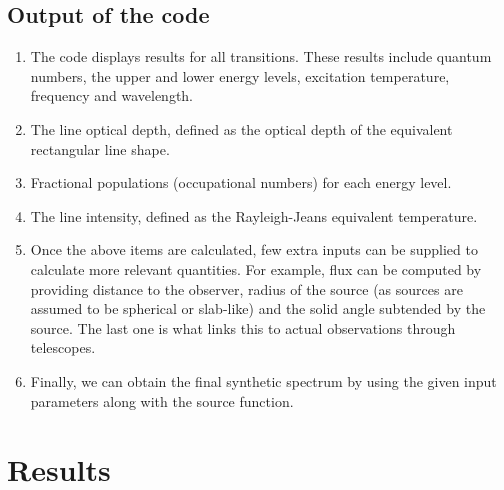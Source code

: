 \documentclass{article}
\begin{document}
\subsection{Output of the code}
\begin{enumerate}
    \item The code displays results for all transitions. These results include
    quantum numbers, the upper and lower energy levels, excitation temperature,
    frequency and wavelength.
    \item The line optical depth, defined as the optical depth of the equivalent rectangular line shape.
    \item Fractional populations (occupational numbers) for each energy level.
    \item The line intensity, defined as the Rayleigh-Jeans equivalent temperature.
    \item Once the above items are calculated, few extra inputs can be supplied to calculate
    more relevant quantities. For example, flux can be computed by providing distance to the
    observer, radius of the source (as sources are assumed to be spherical or slab-like)
    and the solid angle subtended by the source. The last one is what links this to actual
    observations through telescopes.
    \item Finally, we can obtain the final synthetic spectrum by using the given input
    parameters along with the source function.
\end{enumerate}
\section{Results}

\nocite*{}


\end{document}
